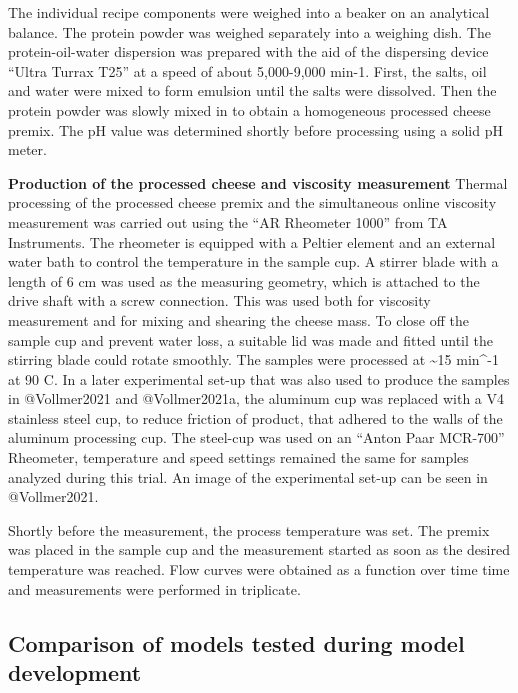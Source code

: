 \documentclass[
]{article}
\begin{document}
The individual recipe components were weighed into a beaker on an
analytical balance. The protein powder was weighed separately into a
weighing dish. The protein-oil-water dispersion was prepared with the
aid of the dispersing device ``Ultra Turrax T25'' at a speed of about
5,000-9,000 min-1. First, the salts, oil and water were mixed to form
emulsion until the salts were dissolved. Then the protein powder was
slowly mixed in to obtain a homogeneous processed cheese premix. The pH
value was determined shortly before processing using a solid pH meter.

\textbf{Production of the processed cheese and viscosity measurement}
\newline Thermal processing of the processed cheese premix and the
simultaneous online viscosity measurement was carried out using the ``AR
Rheometer 1000'' from TA Instruments. The rheometer is equipped with a
Peltier element and an external water bath to control the temperature in
the sample cup. A stirrer blade with a length of 6 cm was used as the
measuring geometry, which is attached to the drive shaft with a screw
connection. This was used both for viscosity measurement and for mixing
and shearing the cheese mass. To close off the sample cup and prevent
water loss, a suitable lid was made and fitted until the stirring blade
could rotate smoothly. The samples were processed at \textasciitilde15
min\^{}-1 at 90 C. In a later experimental set-up that was also used to
produce the samples in @Vollmer2021 and @Vollmer2021a, the aluminum cup
was replaced with a V4 stainless steel cup, to reduce friction of
product, that adhered to the walls of the aluminum processing cup. The
steel-cup was used on an ``Anton Paar MCR-700'' Rheometer, temperature
and speed settings remained the same for samples analyzed during this
trial. An image of the experimental set-up can be seen in @Vollmer2021.

Shortly before the measurement, the process temperature was set. The
premix was placed in the sample cup and the measurement started as soon
as the desired temperature was reached. Flow curves were obtained as a
function over time time and measurements were performed in triplicate.

\subsection{Comparison of models tested during model development}
\end{document}
